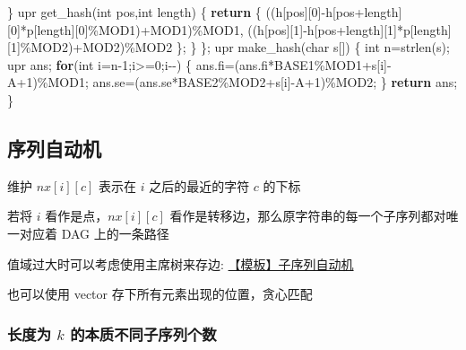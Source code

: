 \documentclass[
]{article}
\newenvironment{Shaded}{}{}
\newcommand{\CharTok}[1]{\textcolor[rgb]{0.25,0.44,0.63}{#1}}
\newcommand{\ControlFlowTok}[1]{\textcolor[rgb]{0.00,0.44,0.13}{\textbf{#1}}}
\newcommand{\DataTypeTok}[1]{\textcolor[rgb]{0.56,0.13,0.00}{#1}}
\newcommand{\DecValTok}[1]{\textcolor[rgb]{0.25,0.63,0.44}{#1}}
\newcommand{\NormalTok}[1]{#1}
\begin{document}
\begin{Shaded}
\begin{Highlighting}[]
\NormalTok{    \}}
\NormalTok{    upr get\_hash(}\DataTypeTok{int}\NormalTok{ pos,}\DataTypeTok{int}\NormalTok{ length)}
\NormalTok{    \{}
        \ControlFlowTok{return}\NormalTok{ \{}
\NormalTok{            ((h[pos][}\DecValTok{0}\NormalTok{]{-}h[pos+length][}\DecValTok{0}\NormalTok{]*p[length][}\DecValTok{0}\NormalTok{]\%MOD1)+MOD1)\%MOD1,}
\NormalTok{            ((h[pos][}\DecValTok{1}\NormalTok{]{-}h[pos+length][}\DecValTok{1}\NormalTok{]*p[length][}\DecValTok{1}\NormalTok{]\%MOD2)+MOD2)\%MOD2}
\NormalTok{        \};}
\NormalTok{    \}}
\NormalTok{\};}
\NormalTok{upr make\_hash(}\DataTypeTok{char}\NormalTok{ s[])}
\NormalTok{\{}
    \DataTypeTok{int}\NormalTok{ n=strlen(s);}
\NormalTok{    upr ans;}
    \ControlFlowTok{for}\NormalTok{(}\DataTypeTok{int}\NormalTok{ i=n{-}}\DecValTok{1}\NormalTok{;i\textgreater{}=}\DecValTok{0}\NormalTok{;i{-}{-})}
\NormalTok{    \{}
\NormalTok{        ans.fi=(ans.fi*BASE1\%MOD1+s[i]{-}}\CharTok{\textquotesingle{}A\textquotesingle{}}\NormalTok{+}\DecValTok{1}\NormalTok{)\%MOD1;}
\NormalTok{        ans.se=(ans.se*BASE2\%MOD2+s[i]{-}}\CharTok{\textquotesingle{}A\textquotesingle{}}\NormalTok{+}\DecValTok{1}\NormalTok{)\%MOD2;}
\NormalTok{    \}   }
    \ControlFlowTok{return}\NormalTok{ ans;}
\NormalTok{\}}
\end{Highlighting}
\end{Shaded}

\hypertarget{ux5e8fux5217ux81eaux52a8ux673a}{%
\subsection{序列自动机}\label{ux5e8fux5217ux81eaux52a8ux673a}}

维护 \(nx[i][c]\) 表示在 \(i\) 之后的最近的字符 \(c\) 的下标

若将 \(i\) 看作是点，\(nx[i][c]\)
看作是转移边，那么原字符串的每一个子序列都对唯一对应着 DAG 上的一条路径

值域过大时可以考虑使用主席树来存边:
\href{https://www.luogu.com.cn/problem/P5826}{【模板】子序列自动机}

也可以使用 vector 存下所有元素出现的位置，贪心匹配

\hypertarget{ux957fux5ea6ux4e3a-k-ux7684ux672cux8d28ux4e0dux540cux5b50ux5e8fux5217ux4e2aux6570}{%
\subsubsection{\texorpdfstring{长度为 \(k\)
的本质不同子序列个数}{长度为 k 的本质不同子序列个数}}\label{ux957fux5ea6ux4e3a-k-ux7684ux672cux8d28ux4e0dux540cux5b50ux5e8fux5217ux4e2aux6570}}
\end{document}
